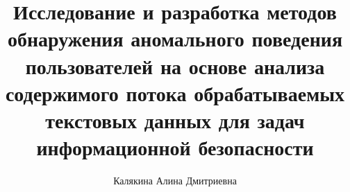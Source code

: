 \title{Исследование и разработка методов обнаружения аномального поведения пользователей на основе анализа содержимого потока обрабатываемых текстовых данных для задач информационной безопасности}
\author{Калякина Алина Дмитриевна}

\makeatletter
\renewcommand\@maketitle{
	\begin{titlepage}
		\begin{center}
			\texttt{[image: msu]} \\
		Московский государственный университет имени М.\,В. Ломоносова
			\\
			Факультет вычислительной математики и кибернетики \\
			Кафедра автоматизации систем вычислительных комплексов \\
			
			\vspace{8em}
			
			{\Large \@author} \\[1.5em]
			{\LARGE \textbf{\@title} \par}
			
			\vspace{4.5em}
			
			{\Large \textsc{курсовая работа}}
			
			\vfill
			
			\begin{flushright}
				{\large
					\textbf{Научный руководитель}:\\
					к.\,ф.-м.\,н., ???\\
					Д.\,В.~Царёв\\
					\vspace{0.2em}
				}
			\end{flushright}
			\vfill
			
			Москва, 2020
		\end{center}
	\end{titlepage}
}
\makeatother

\maketitle
\setcounter{page}{2}
